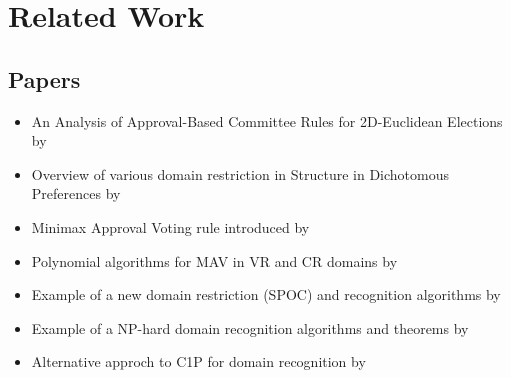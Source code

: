 
\chapter{Related Work}


\section{Papers}

\begin{itemize}
    \item An Analysis of Approval-Based Committee Rules for 2D-Euclidean Elections by \cite{falisz}
    \item Overview of various domain restriction in Structure in Dichotomous Preferences by \cite{DBLP:journals/corr/ElkindL15}
    \item Minimax Approval Voting rule introduced by \cite{minimax-Brams-Kilgour-Sanver}
    \item Polynomial algorithms for MAV in VR and CR domains by \cite{mav}
    \item Example of a new domain restriction (SPOC) and recognition algorithms by \cite{DBLP:journals/jair/PetersL20}
    \item Example of a NP-hard domain recognition algorithms and theorems by \cite{peters2016recognising}
    \item Alternative approch to C1P for domain recognition by \cite{DBLP:journals/jair/MagieraF19}
\end{itemize}
